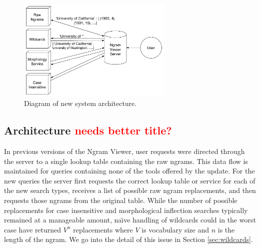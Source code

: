\documentclass[11pt]{article}
\begin{document}
\begin{figure}
\includegraphics[width=20em,keepaspectratio=true]{system_architecture}
\caption{Diagram of new system architecture.}
\end{figure}
\subsection{Architecture \textcolor{red}{needs better title?}}
	In previous versions of the Ngram Viewer, user requests were directed through the server to a single lookup table containing the raw ngrams. This data flow is maintained for queries containing none of the tools offered by the update. For the new queries the server first requests the correct lookup table or service for each of the new search types, receives a list of possible raw ngram replacements, and then requests those ngrams from the original table. While the number of possible replacements for case insensitive and morphological inflection searches typically remained at a manageable amount, na\"\i ve handling of wildcards could in the worst case have returned $V^n$ replacements where $V$ is vocabulary size and $n$ is the length of the ngram. We go into the detail of this issue in Section \ref{sec:wildcards}.
\end{document}
